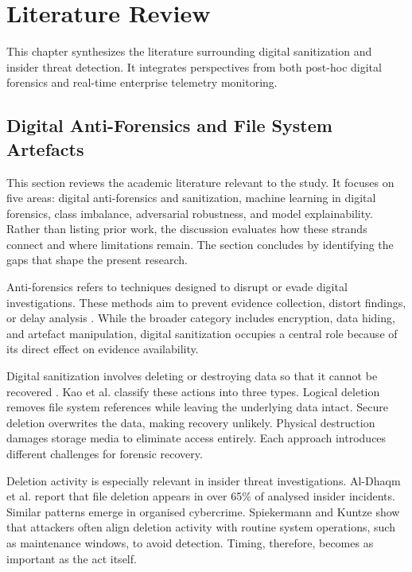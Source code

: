 \chapter{Literature Review}
\label{ch:lit_review}

This chapter synthesizes the literature surrounding digital sanitization and insider threat detection. It integrates perspectives from both post-hoc digital forensics and real-time enterprise telemetry monitoring.

\section{Digital Anti-Forensics and File System Artefacts}



This section reviews the academic literature relevant to the study. It focuses on five areas: digital anti-forensics and sanitization, machine learning in digital forensics, class imbalance, adversarial robustness, and model explainability. Rather than listing prior work, the discussion evaluates how these strands connect and where limitations remain. The section concludes by identifying the gaps that shape the present research.

Anti-forensics refers to techniques designed to disrupt or evade digital investigations. These methods aim to prevent evidence collection, distort findings, or delay analysis \cite{ref22}. While the broader category includes encryption, data hiding, and artefact manipulation, digital sanitization occupies a central role because of its direct effect on evidence availability.

Digital sanitization involves deleting or destroying data so that it cannot be recovered \cite{ref2}. Kao et al. \cite{ref23} classify these actions into three types. Logical deletion removes file system references while leaving the underlying data intact. Secure deletion overwrites the data, making recovery unlikely. Physical destruction damages storage media to eliminate access entirely. Each approach introduces different challenges for forensic recovery.

Deletion activity is especially relevant in insider threat investigations. Al-Dhaqm et al. \cite{ref24} report that file deletion appears in over 65\% of analysed insider incidents. Similar patterns emerge in organised cybercrime. Spiekermann and Kuntze \cite{ref25} show that attackers often align deletion activity with routine system operations, such as maintenance windows, to avoid detection. Timing, therefore, becomes as important as the act itself.


